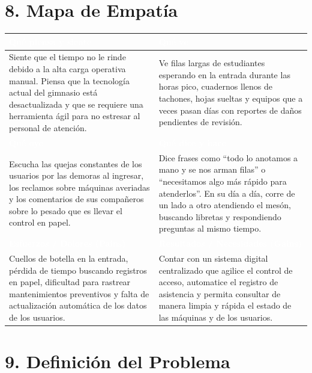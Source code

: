 \documentclass[10pt,letterpaper]{article}
\renewcommand{\arraystretch}{1.15}
\newcommand{\titulo}[1]{\section*{\textcolor{azul}{#1}}}
\begin{document}
\titulo{8. Mapa de Empatía}
\renewcommand{\arraystretch}{1.25}
\noindent\begin{tabularx}{\linewidth}{|>{\raggedright\arraybackslash}X|>{\raggedright\arraybackslash}X|}
\hline
\cellcolor{azul}\textcolor{white}{\textbf{Qué piensa y siente}} & \cellcolor{azul}\textcolor{white}{\textbf{Qué ve}}\\
\hline
\cellcolor{palido}Siente que el tiempo no le rinde debido a la alta carga operativa manual. Piensa que la tecnología actual del gimnasio está desactualizada y que se requiere una herramienta ágil para no estresar al personal de atención.
&
\cellcolor{palido}Ve filas largas de estudiantes esperando en la entrada durante las horas pico, cuadernos llenos de tachones, hojas sueltas y equipos que a veces pasan días con reportes de daños pendientes de revisión.\\
\hline
\cellcolor{azul}\textcolor{white}{\textbf{Qué oye}} & \cellcolor{azul}\textcolor{white}{\textbf{Qué dice y hace}}\\
\hline
\cellcolor{palido}Escucha las quejas constantes de los usuarios por las demoras al ingresar, los reclamos sobre máquinas averiadas y los comentarios de sus compañeros sobre lo pesado que es llevar el control en papel.
&
\cellcolor{palido}Dice frases como ``todo lo anotamos a mano y se nos arman filas'' o ``necesitamos algo más rápido para atenderlos''. En su día a día, corre de un lado a otro atendiendo el mesón, buscando libretas y respondiendo preguntas al mismo tiempo.\\
\hline
\cellcolor{azul}\textcolor{white}{\textbf{Esfuerzos / Dolores (Pains)}} & \cellcolor{azul}\textcolor{white}{\textbf{Resultados / Necesidades (Gains)}}\\
\hline
\cellcolor{palido}Cuellos de botella en la entrada, pérdida de tiempo buscando registros en papel, dificultad para rastrear mantenimientos preventivos y falta de actualización automática de los datos de los usuarios.
&
\cellcolor{palido}Contar con un sistema digital centralizado que agilice el control de acceso, automatice el registro de asistencia y permita consultar de manera limpia y rápida el estado de las máquinas y de los usuarios.\\
\hline
\end{tabularx}
\renewcommand{\arraystretch}{1.15}

\titulo{9. Definición del Problema}
\noindent{}
\end{document}
